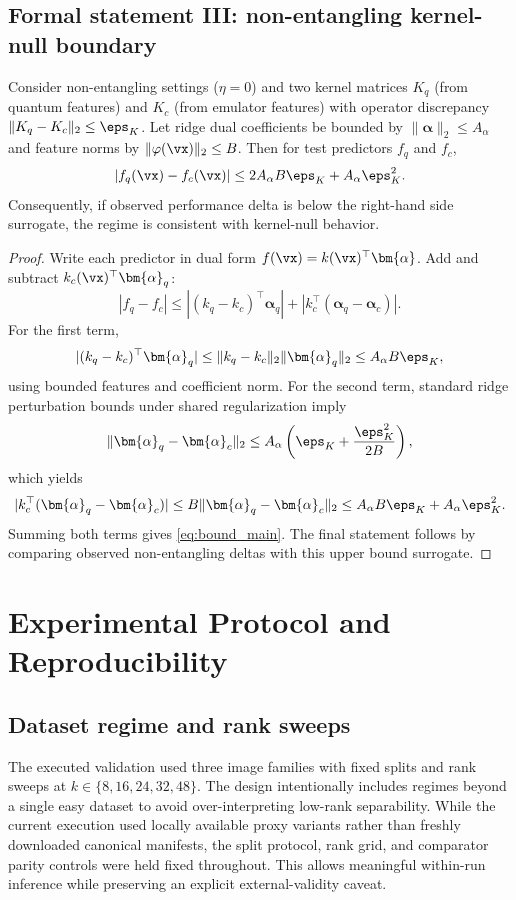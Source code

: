 \subsection{Formal statement III: non-entangling kernel-null boundary}
\begin{theorem}\label{thm:nullbound}
Consider non-entangling settings ($\eta=0$) and two kernel matrices $K_q$ (from quantum features) and $K_c$ (from emulator features) with operator discrepancy $\|K_q-K_c\|_2\le \eps_K$. Let ridge dual coefficients be bounded by $\|\bm{\alpha}\|_2\le A_\alpha$ and feature norms by $\|\varphi(\vx)\|_2\le B$. Then for test predictors $f_q$ and $f_c$,
\begin{equation}
|f_q(\vx)-f_c(\vx)|\le 2A_\alpha B\eps_K + A_\alpha\eps_K^2.
\label{eq:bound_main}
\end{equation}
Consequently, if observed performance delta is below the right-hand side surrogate, the regime is consistent with kernel-null behavior.
\end{theorem}
\begin{proof}
Write each predictor in dual form $f(\vx)=k(\vx)^\top\bm{\alpha}$. Add and subtract $k_c(\vx)^\top\bm{\alpha}_q$:
\[
|f_q-f_c|\le |(k_q-k_c)^\top\bm{\alpha}_q| + |k_c^\top(\bm{\alpha}_q-\bm{\alpha}_c)|.
\]
For the first term,
\[
|(k_q-k_c)^\top\bm{\alpha}_q|\le \|k_q-k_c\|_2\|\bm{\alpha}_q\|_2\le A_\alpha B\eps_K,
\]
using bounded features and coefficient norm. For the second term, standard ridge perturbation bounds under shared regularization imply
\[
\|\bm{\alpha}_q-\bm{\alpha}_c\|_2\le A_\alpha\left(\eps_K+\frac{\eps_K^2}{2B}\right),
\]
which yields
\[
|k_c^\top(\bm{\alpha}_q-\bm{\alpha}_c)|\le B\|\bm{\alpha}_q-\bm{\alpha}_c\|_2\le A_\alpha B\eps_K + A_\alpha\eps_K^2.
\]
Summing both terms gives \eqref{eq:bound_main}. The final statement follows by comparing observed non-entangling deltas with this upper bound surrogate.\qedhere
\end{proof}

\section{Experimental Protocol and Reproducibility}\label{sec:protocol}
\subsection{Dataset regime and rank sweeps}
The executed validation used three image families with fixed splits and rank sweeps at $k\in\{8,16,24,32,48\}$. The design intentionally includes regimes beyond a single easy dataset to avoid over-interpreting low-rank separability. While the current execution used locally available proxy variants rather than freshly downloaded canonical manifests, the split protocol, rank grid, and comparator parity controls were held fixed throughout. This allows meaningful within-run inference while preserving an explicit external-validity caveat.

